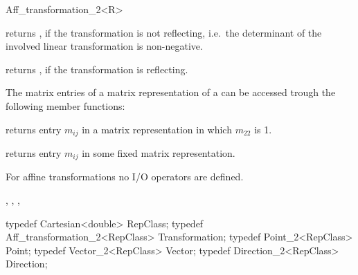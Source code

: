 \begin{ccRefClass}{Aff_transformation_2<R>}

       {returns , if the transformation is not reflecting,
        i.e.\ the determinant of the involved linear transformation is
        non-negative.}

       {returns , if the transformation is reflecting.}



The matrix entries of a matrix representation of a 
can be accessed trough the following member functions:

                      {}
\ccGlue
{}
       {returns entry $m_{ij}$ in a matrix representation in which $m_{22}$ is 1.}

                      {}
\ccGlue
{}
       {returns entry $m_{ij}$ in some fixed matrix representation.} 


For affine transformations  no I/O operators are defined.

%

\ccSeeAlso
{}, 
, 
,
 \\

\ccExample

\begin{cprog}
  typedef Cartesian<double> RepClass;
  typedef Aff_transformation_2<RepClass> Transformation;
  typedef Point_2<RepClass> Point;
  typedef Vector_2<RepClass> Vector;
  typedef Direction_2<RepClass> Direction;


\end{cprog}
\end{ccRefClass}
